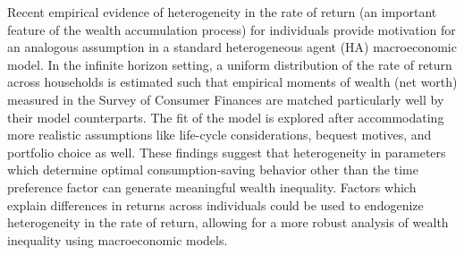  Recent empirical evidence of heterogeneity in the rate of return (an important feature of the wealth accumulation process) for individuals provide motivation for an analogous assumption in a standard heterogeneous agent (HA) macroeconomic model. In the infinite horizon setting, a uniform distribution of the rate of return across households is estimated such that empirical moments of wealth (net worth) measured in the Survey of Consumer Finances are matched particularly well by their model counterparts. The fit of the model is explored after accommodating more realistic assumptions like life-cycle considerations, bequest motives, and portfolio choice as well. These findings suggest that heterogeneity in parameters which determine optimal consumption-saving behavior other than the time preference factor can generate meaningful wealth inequality. Factors which explain differences in returns across individuals could be used to endogenize heterogeneity in the rate of return, allowing for a more robust analysis of wealth inequality using macroeconomic models.
